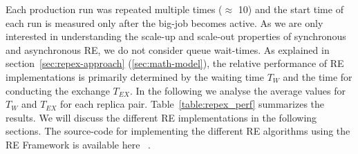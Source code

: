 \documentclass{rspublic}
\newcommand{\jhanote}[1]{ {\textcolor{red} { ***shantenu: #1 }}}
\newcommand{\alnote}[1]{ {\textcolor{blue} { ***andre: #1 }}}
\newcommand{\athotanote}[1]{ {\textcolor{green} { ***athota: #1 }}}
\newcommand{\alnote}[1]{}
\newcommand{\athotanote}[1]{}
\newcommand{\jhanote}[1]{}
\begin{document}

Each production run was repeated multiple times  ($\approx$ 10) %
and the start time of each run is measured only after the big-job
becomes active.  As we are only interested in understanding the
scale-up and scale-out properties of synchronous and asynchronous RE,
we do not consider queue wait-times.  As explained in
section~\ref{sec:repex-approach} (\ref{sec:math-model}), the relative
performance of RE implementations is primarily determined by the
waiting time $T_W$ and the time for conducting the exchange
$T_{EX}$. In the following we analyse the average values for $T_{W}$
and $T_{EX}$ for each replica pair.  Table~\ref{table:repex_perf}
summarizes the results. We will discuss the different RE
implementations in the following sections.  The source-code for
implementing the different RE algorithms using the RE Framework is
available here ~\citep{async-re_url}.  %




\end{document}
